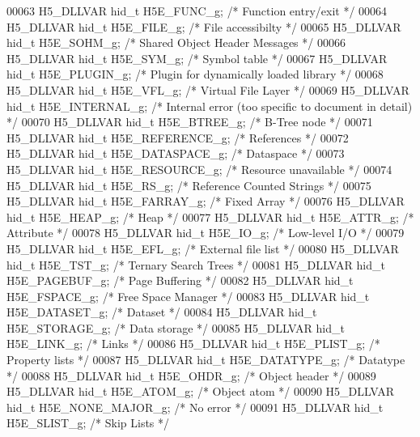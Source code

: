 \begin{DoxyCode}
00063 H5\_DLLVAR hid\_t H5E\_FUNC\_g;          \textcolor{comment}{/* Function entry/exit */}
00064 H5\_DLLVAR hid\_t H5E\_FILE\_g;          \textcolor{comment}{/* File accessibilty */}
00065 H5\_DLLVAR hid\_t H5E\_SOHM\_g;          \textcolor{comment}{/* Shared Object Header Messages */}
00066 H5\_DLLVAR hid\_t H5E\_SYM\_g;           \textcolor{comment}{/* Symbol table */}
00067 H5\_DLLVAR hid\_t H5E\_PLUGIN\_g;        \textcolor{comment}{/* Plugin for dynamically loaded library */}
00068 H5\_DLLVAR hid\_t H5E\_VFL\_g;           \textcolor{comment}{/* Virtual File Layer */}
00069 H5\_DLLVAR hid\_t H5E\_INTERNAL\_g;      \textcolor{comment}{/* Internal error (too specific to document in detail) */}
00070 H5\_DLLVAR hid\_t H5E\_BTREE\_g;         \textcolor{comment}{/* B-Tree node */}
00071 H5\_DLLVAR hid\_t H5E\_REFERENCE\_g;     \textcolor{comment}{/* References */}
00072 H5\_DLLVAR hid\_t H5E\_DATASPACE\_g;     \textcolor{comment}{/* Dataspace */}
00073 H5\_DLLVAR hid\_t H5E\_RESOURCE\_g;      \textcolor{comment}{/* Resource unavailable */}
00074 H5\_DLLVAR hid\_t H5E\_RS\_g;            \textcolor{comment}{/* Reference Counted Strings */}
00075 H5\_DLLVAR hid\_t H5E\_FARRAY\_g;        \textcolor{comment}{/* Fixed Array */}
00076 H5\_DLLVAR hid\_t H5E\_HEAP\_g;          \textcolor{comment}{/* Heap */}
00077 H5\_DLLVAR hid\_t H5E\_ATTR\_g;          \textcolor{comment}{/* Attribute */}
00078 H5\_DLLVAR hid\_t H5E\_IO\_g;            \textcolor{comment}{/* Low-level I/O */}
00079 H5\_DLLVAR hid\_t H5E\_EFL\_g;           \textcolor{comment}{/* External file list */}
00080 H5\_DLLVAR hid\_t H5E\_TST\_g;           \textcolor{comment}{/* Ternary Search Trees */}
00081 H5\_DLLVAR hid\_t H5E\_PAGEBUF\_g;       \textcolor{comment}{/* Page Buffering */}
00082 H5\_DLLVAR hid\_t H5E\_FSPACE\_g;        \textcolor{comment}{/* Free Space Manager */}
00083 H5\_DLLVAR hid\_t H5E\_DATASET\_g;       \textcolor{comment}{/* Dataset */}
00084 H5\_DLLVAR hid\_t H5E\_STORAGE\_g;       \textcolor{comment}{/* Data storage */}
00085 H5\_DLLVAR hid\_t H5E\_LINK\_g;          \textcolor{comment}{/* Links */}
00086 H5\_DLLVAR hid\_t H5E\_PLIST\_g;         \textcolor{comment}{/* Property lists */}
00087 H5\_DLLVAR hid\_t H5E\_DATATYPE\_g;      \textcolor{comment}{/* Datatype */}
00088 H5\_DLLVAR hid\_t H5E\_OHDR\_g;          \textcolor{comment}{/* Object header */}
00089 H5\_DLLVAR hid\_t H5E\_ATOM\_g;          \textcolor{comment}{/* Object atom */}
00090 H5\_DLLVAR hid\_t H5E\_NONE\_MAJOR\_g;    \textcolor{comment}{/* No error */}
00091 H5\_DLLVAR hid\_t H5E\_SLIST\_g;         \textcolor{comment}{/* Skip Lists */}

\end{DoxyCode}
